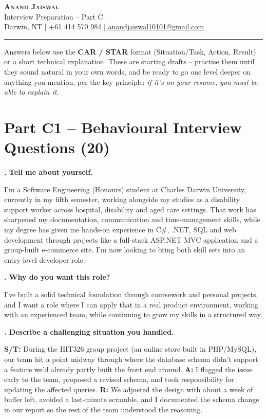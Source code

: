 \documentclass[10.5pt]{article}
\newcounter{qnum}
\newcommand{\resetq}{\setcounter{qnum}{0}}
\newcommand{\qa}[2]{%
  \stepcounter{qnum}%
  \textbf{\theqnum. #1}\par
  #2\par
  \vspace{6pt}
}
\begin{document}
\begin{center}
{\LARGE \scshape \bfseries Anand Jaiswal}\\[2pt]
{\large Interview Preparation -- Part C}\\[2pt]
Darwin, NT \quad | \quad +61 414 570 984 \quad | \quad \href{mailto:anandjaiswal10101@gmail.com}{anandjaiswal10101@gmail.com}
\end{center}
\vspace{4pt}
\hrule
\vspace{6pt}

Answers below use the \textbf{CAR / STAR} format (Situation/Task, Action, Result) or a short technical explanation. These are starting drafts -- practise them until they sound natural in your own words, and be ready to go one level deeper on anything you mention, per the key principle: \textit{if it's on your resume, you must be able to explain it}.

\section{Part C1 -- Behavioural Interview Questions (20)}
\resetq

\qa{Tell me about yourself.}{I'm a Software Engineering (Honours) student at Charles Darwin University, currently in my fifth semester, working alongside my studies as a disability support worker across hospital, disability and aged care settings. That work has sharpened my documentation, communication and time-management skills, while my degree has given me hands-on experience in C\#, .NET, SQL and web development through projects like a full-stack ASP.NET MVC application and a group-built e-commerce site. I'm now looking to bring both skill sets into an entry-level developer role.}

\qa{Why do you want this role?}{I've built a solid technical foundation through coursework and personal projects, and I want a role where I can apply that in a real product environment, working with an experienced team, while continuing to grow my skills in a structured way.}

\qa{Describe a challenging situation you handled.}{\textbf{S/T:} During the HIT326 group project (an online store built in PHP/MySQL), our team hit a point midway through where the database schema didn't support a feature we'd already partly built the front end around. \textbf{A:} I flagged the issue early to the team, proposed a revised schema, and took responsibility for updating the affected queries. \textbf{R:} We adjusted the design with about a week of buffer left, avoided a last-minute scramble, and I documented the schema change in our report so the rest of the team understood the reasoning.}
\end{document}
